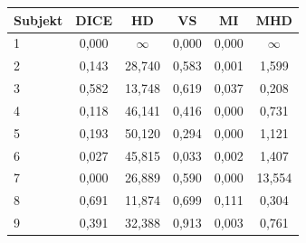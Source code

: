 \begin{tabular}{l c c c c c}
 \hline
Subjekt & DICE & HD & VS & MI & MHD \\ \hline
1 & 0,000 & $\infty$ & 0,000 & 0,000 & $\infty$ \\
2 & 0,143 & 28,740 & 0,583 & 0,001 & 1,599 \\
3 & 0,582 & 13,748 & 0,619 & 0,037 & 0,208 \\
4 & 0,118 & 46,141 & 0,416 & 0,000 & 0,731 \\
5 & 0,193 & 50,120 & 0,294 & 0,000 & 1,121 \\
6 & 0,027 & 45,815 & 0,033 & 0,002 & 1,407 \\
7 & 0,000 & 26,889 & 0,590 & 0,000 & 13,554 \\
8 & 0,691 & 11,874 & 0,699 & 0,111 & 0,304 \\
9 & 0,391 & 32,388 & 0,913 & 0,003 & 0,761 \\
\hline 
 \end{tabular}

